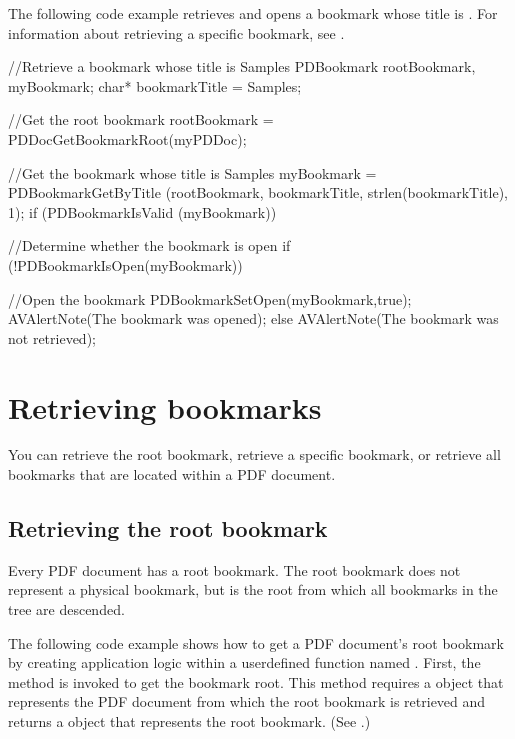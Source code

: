 \documentclass[letterpaper,12pt,english,openany,oneside]{sphinxmanual}
\begin{document}
The following code example retrieves and opens a bookmark whose title is . For information about retrieving a specific bookmark, see .

\begin{sphinxVerbatim}[commandchars=\\\{\}]
//Retrieve a bookmark whose title is Samples
PDBookmark rootBookmark, myBookmark;
char* bookmarkTitle = \PYGZdq{}Samples\PYGZdq{};


//Get the root bookmark
rootBookmark = PDDocGetBookmarkRoot(myPDDoc);


//Get the bookmark whose title is Samples
myBookmark = PDBookmarkGetByTitle (rootBookmark, bookmarkTitle, strlen(bookmarkTitle), \PYGZhy{}1);
if (PDBookmarkIsValid (myBookmark))\PYGZob{}


//Determine whether the bookmark is open
 if (!PDBookmarkIsOpen(myBookmark))\PYGZob{}

//Open the bookmark
     PDBookmarkSetOpen(myBookmark,true);
      AVAlertNote(\PYGZdq{}The bookmark was opened\PYGZdq{});
  \PYGZcb{}
\PYGZcb{}
else
  AVAlertNote(\PYGZdq{}The bookmark was not retrieved\PYGZdq{});
\end{sphinxVerbatim}


\section{Retrieving bookmarks}
\label{\detokenize{Plugins_Bookmark:retrieving-bookmarks}}
You can retrieve the root bookmark, retrieve a specific bookmark, or retrieve all bookmarks that are located within a PDF document.


\subsection{Retrieving the root bookmark}
\label{\detokenize{Plugins_Bookmark:retrieving-the-root-bookmark}}
Every PDF document has a root bookmark. The root bookmark does not represent a physical bookmark, but is the root from which all bookmarks in the tree are descended.

The following code example shows how to get a PDF document’s root bookmark by creating application logic within a user\sphinxhyphen{}defined function named . First, the  method is invoked to get the bookmark root. This method requires a  object that represents the PDF document from which the root bookmark is retrieved and returns a  object that represents the root bookmark. (See .)
\end{document}
